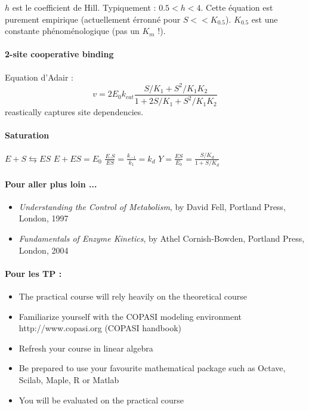 \noindent $h$ est le coefficient de Hill. Typiquement : $0.5<h<4$.
Cette équation est purement empirique (actuellement érronné pour $S<<K_{0.5}$).
$K_{0.5}$ est une constante phénoménologique (pas un $K_m$ !).

\paragraph{2-site cooperative binding}
Equation d'Adair :
$$v=2E_0k_{cat} \frac{S/K_1 + S^2 / K_1K_2}{1+2S/K_1+S^2/K_1K_2}$$
\noindent reastically captures site dependencies.

\paragraph{Saturation}
$E+S \leftrightarrows ES$
$E+ES=E_0$
$\frac{E.S}{ES}=\frac{k_{-1}}{k_1}=k_d$
$Y=\frac{ES}{E_0}=\frac{S/K_d}{1+S/K_d}$


\paragraph{Pour aller plus loin ...}
\begin{itemize}
\item \textit{Understanding the Control of Metabolism}, by David Fell, Portland Press, London, 1997
\item \textit{Fundamentals of Enzyme Kinetics}, by Athel Cornish-Bowden, Portland Press, London, 2004
\end{itemize}


\paragraph{Pour les TP :}
\begin{itemize}
\item The practical course will rely heavily on the theoretical course
\item Familiarize yourself with the COPASI modeling environment
http://www.copasi.org  (COPASI handbook)
\item  Refresh your course in linear algebra
\item Be prepared to use your favourite mathematical package
such as Octave, Scilab, Maple, R or Matlab
\item You will be evaluated on the practical course
\end{itemize}
